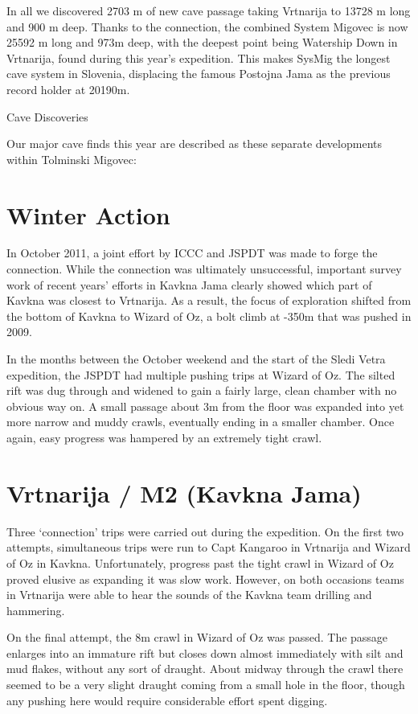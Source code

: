 In all we discovered 2703 m of new cave passage taking Vrtnarija to
13728 m long and 900 m deep. Thanks to the connection, the combined
System Migovec is now 25592 m long and 973m deep, with the deepest point
being Watership Down in Vrtnarija, found during this year's expedition.
This makes SysMig the longest cave system in Slovenia, displacing the
famous Postojna Jama as the previous record holder at 20190m.

Cave Discoveries

Our major cave finds this year are described as these separate
developments within Tolminski Migovec:

\section{Winter Action}\label{winter-action}

In October 2011, a joint effort by ICCC and JSPDT was made to forge the
connection. While the connection was ultimately unsuccessful, important
survey work of recent years' efforts in Kavkna Jama clearly showed which
part of Kavkna was closest to Vrtnarija. As a result, the focus of
exploration shifted from the bottom of Kavkna to Wizard of Oz, a bolt
climb at -350m that was pushed in 2009.

In the months between the October weekend and the start of the Sledi
Vetra expedition, the JSPDT had multiple pushing trips at Wizard of Oz.
The silted rift was dug through and widened to gain a fairly large,
clean chamber with no obvious way on. A small passage about 3m from the
floor was expanded into yet more narrow and muddy crawls, eventually
ending in a smaller chamber. Once again, easy progress was hampered by
an extremely tight crawl.

\section{Vrtnarija / M2 (Kavkna Jama)}\label{vrtnarija-m2-kavkna-jama}

Three `connection' trips were carried out during the expedition. On the
first two attempts, simultaneous trips were run to Capt Kangaroo in
Vrtnarija and Wizard of Oz in Kavkna. Unfortunately, progress past the
tight crawl in Wizard of Oz proved elusive as expanding it was slow
work. However, on both occasions teams in Vrtnarija were able to hear
the sounds of the Kavkna team drilling and hammering.

On the final attempt, the 8m crawl in Wizard of Oz was passed. The
passage enlarges into an immature rift but closes down almost
immediately with silt and mud flakes, without any sort of draught. About
midway through the crawl there seemed to be a very slight draught coming
from a small hole in the floor, though any pushing here would require
considerable effort spent digging.

